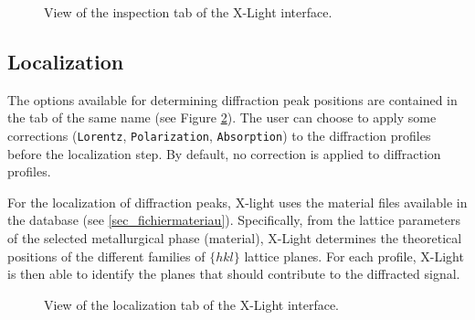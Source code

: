 \documentclass[french,a4paper]{report}
\begin{document}
\begin{figure}[h!]
\centering
{}
\caption{View of the inspection tab of the X-Light interface.}
\label{fig_inspect}
\end{figure}

\subsection{Localization}

The options available for determining diffraction peak positions are contained in the tab of the same name (see Figure \ref{fig_localize}). The user can choose to apply some corrections (\texttt{Lorentz}, \texttt{Polarization}, \texttt{Absorption}) to the diffraction profiles before the localization step. By default, no correction is applied to diffraction profiles.

For the localization of diffraction peaks, X-light uses the material files available in the database (see \ref{sec_fichiermateriau}). Specifically, from the lattice parameters of the selected metallurgical phase (material), X-Light determines the theoretical positions of the different families of $\{hkl\}$ lattice planes. For each profile, X-Light is then able to identify the planes that should contribute to the diffracted signal. 

\begin{figure}[bh!]
\centering
{}
\caption{View of the localization tab of the X-Light interface.}
\label{fig_localize}
\end{figure}
\end{document}
